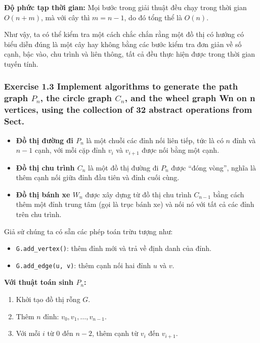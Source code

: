 \documentclass{article}
\begin{document}
	\vspace{1em}
	\textbf{Độ phức tạp thời gian:} Mọi bước trong giải thuật đều chạy trong thời gian $O(n + m)$, mà với cây thì $m = n - 1$, do đó tổng thể là $O(n)$.
	
	\vspace{1em}
	Như vậy, ta có thể kiểm tra một cách chắc chắn rằng một đồ thị có hướng có biểu diễn đúng là một cây hay không bằng các bước kiểm tra đơn giản về số cạnh, bậc vào, chu trình và liên thông, tất cả đều thực hiện được trong thời gian tuyến tính.
	
	\subsubsection*{ Exercise 1.3 Implement algorithms to generate the path graph $P_n$, the circle graph $C_n$, and the wheel graph Wn on n vertices, using the collection of 32 abstract operations from Sect.}
	
	\begin{itemize}
		\item \textbf{Đồ thị đường đi $P_n$} là một chuỗi các đỉnh nối liên tiếp, tức là có $n$ đỉnh và $n - 1$ cạnh, với mỗi cặp đỉnh $v_i$ và $v_{i+1}$ được nối bằng một cạnh.
		
		\item \textbf{Đồ thị chu trình $C_n$} là một đồ thị đường đi $P_n$ được “đóng vòng”, nghĩa là thêm cạnh nối giữa đỉnh đầu tiên và đỉnh cuối cùng.
		
		\item \textbf{Đồ thị bánh xe $W_n$} được xây dựng từ đồ thị chu trình $C_{n-1}$ bằng cách thêm một đỉnh trung tâm (gọi là trục bánh xe) và nối nó với tất cả các đỉnh trên chu trình.
	\end{itemize}
	
	Giả sử chúng ta có sẵn các phép toán trừu tượng như:
	\begin{itemize}
		\item \texttt{G.add\_vertex()}: thêm đỉnh mới và trả về định danh của đỉnh.
		\item \texttt{G.add\_edge(u, v)}: thêm cạnh nối hai đỉnh $u$ và $v$.
	\end{itemize}
	
	\textbf{Với thuật toán sinh $P_n$:}
	\begin{enumerate}
		\item Khởi tạo đồ thị rỗng $G$.
		\item Thêm $n$ đỉnh: $v_0, v_1, \ldots, v_{n-1}$.
		\item Với mỗi $i$ từ $0$ đến $n-2$, thêm cạnh từ $v_i$ đến $v_{i+1}$.
	\end{enumerate}
	
\end{document}
